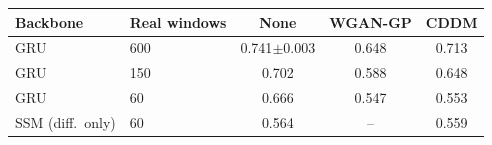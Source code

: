 \begin{tabular}{llccc}
\toprule
Backbone & Real windows & None & WGAN-GP & CDDM \\
\midrule
GRU & 600 & 0.741$\pm$0.003 & 0.648 & 0.713 \\
GRU & 150 & 0.702 & 0.588 & 0.648 \\
GRU & 60 & 0.666 & 0.547 & 0.553 \\
SSM (diff.\ only) & 60 & 0.564 & -- & 0.559 \\
\bottomrule
\end{tabular}

